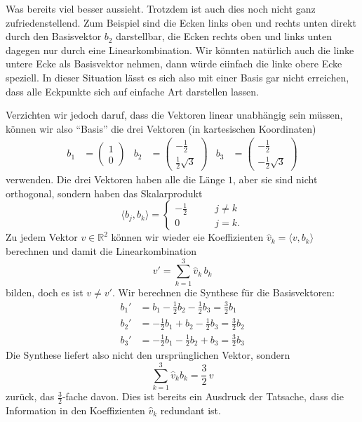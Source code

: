 Was bereits viel besser aussieht.
Trotzdem ist auch dies noch nicht ganz zufriedenstellend. 
Zum Beispiel sind die Ecken links oben und rechts unten direkt durch den
Basisvektor $b_2$ darstellbar, die Ecken rechts oben und links unten
dagegen nur durch eine Linearkombination.
Wir könnten natürlich auch die linke untere Ecke als Basisvektor nehmen,
dann würde eiinfach die linke obere Ecke speziell.
In dieser Situation lässt es sich also mit einer Basis gar nicht erreichen,
dass alle Eckpunkte sich auf einfache Art darstellen lassen.

Verzichten wir jedoch daruf, dass die Vektoren linear unabhängig sein müssen,
können wir also ``Basis'' die drei Vektoren (in kartesischen Koordinaten)
\begin{align*}
b_1
&=
\begin{pmatrix}1\\0\end{pmatrix}
&
b_2
&=
\begin{pmatrix}-\frac12\\\frac12\sqrt{3}\end{pmatrix}
&
b_3
&=
\begin{pmatrix}-\frac12\\-\frac12\sqrt{3}\end{pmatrix}
\end{align*}
verwenden.
Die drei Vektoren haben alle die Länge $1$, aber sie sind nicht
orthogonal, sondern haben das Skalarprodukt
\[
\langle b_j,b_k\rangle
=
\begin{cases}
-\frac12&\qquad j\ne k\\
0&\qquad j=k.
\end{cases}
\]
Zu jedem Vektor $v\in\mathbb R^2$ können wir wieder eie Koeffizienten
$\hat{v}_k=\langle v,b_k\rangle$ berechnen und damit die Linearkombination
\[
v' = \sum_{k=1}^3 \hat{v}_k\,b_k
\]
bilden,
doch es ist $v\ne v'$.
Wir berechnen die Synthese für die Basisvektoren:
\begin{align*}
b_1'
&=
b_1 - \frac12 b_2 - \frac 12 b_3
=
\frac32b_1
\\
b_2'
&=
-\frac12 b_1 + b_2 -\frac12 b_3
=
\frac32b_2
\\
b_3'
&=
-\frac12b_1-\frac12 b_2 + b_3
=
\frac32b_3
\end{align*}
Die Synthese liefert also nicht den ursprünglichen Vektor, sondern
\begin{equation}
\sum_{k=1}^3 \hat{v}_k b_k = \frac32\,v
\label{geometrie:32beispiel}
\end{equation}
zurück, das $\frac32$-fache davon.
Dies ist bereits ein Ausdruck der Tatsache, dass die Information in den
Koeffizienten $\hat{v}_k$ redundant ist.

